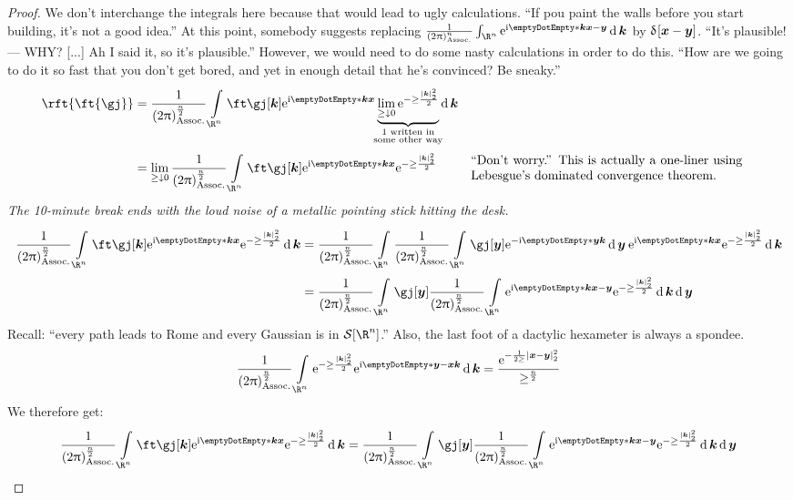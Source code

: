 \documentclass[10pt]{article}
\newcommand{\Rn}{{\R^n}}
\newcommand{\Schwartz}{{\SchwartzSpace\of{\Rn}}}
\newcommand{\sqftnrm}{\frac{1}{\pa{2\Pi}^n} }
\newcommand{\ftnrm}{\frac{1}{\pa{2\Pi}^\frac{n}{2}} }
\newcommand\commentbox[1]{\parbox{7.5cm}{#1}}
\begin{document}
\begin{proposition}
\begin{proof}
      We don't interchange the integrals here because that would lead to ugly calculations. ``If pou paint the walls before you start building, it's not a good idea.''
      At this point, somebody suggests replacing $\sqftnrm\int\Rn \E^{\I\scal\vk{\pascal{\vx-\vy}}}\diffd\vk$ by $\DiracDelta\of{\vx-\vy}$. ``It's plausible! --- WHY? [...] Ah I said it, so it's plausible.'' However, we would need to do some nasty calculations in order to do this. ``How are we going to do it so fast that you don't get bored, and yet in enough detail that he's convinced? Be sneaky.''
      \begin{align*}
        \rft{\ft{\gj}}
        &=\ftnrm\int\Rn\ft\gj\of\vk\E^{\I\scal\vk\vx}
        \underbrace{\lim_{\ge\downarrow 0}\E^{-\ge\frac{\norm\vk^2}{2}}}_{\mathclap{\substack{1
        \text{ written in}\\\text{some other way}}}}\diffd\vk\\
        &=\lim_{\ge\downarrow 0}\ftnrm\int\Rn\ft\gj\of\vk\E^{\I\scal\vk\vx}
        \E^{-\ge\frac{\norm\vk^2}{2}}&&\commentbox{``Don't worry.'' This is actually a one-liner 
        using Lebesgue's dominated convergence theorem.}
      \end{align*}
      \emph{The 10-minute break ends with the loud noise of a metallic pointing stick hitting the desk.}
      \begin{align*}
        \ftnrm\int\Rn\ft\gj\of\vk\E^{\I\scal\vk\vx}\E^{-\ge\frac{\norm\vk^2}{2}}\diffd\vk
        &=\ftnrm\int\Rn\ftnrm\int\Rn\gj\of\vy\E^{-\I\scal\vy\vk}\diffd\vy\:
        \E^{\I\scal\vk\vx}\E^{-\ge\frac{\norm\vk^2}{2}}\diffd\vk\\
        &=\ftnrm\int\Rn\gj\of\vy\ftnrm\int\Rn\E^{\I\scal\vk{\pascal{\vx-\vy}}}
        \E^{-\ge\frac{\norm\vk^2}{2}}\diffd\vk\diffd\vy
      \end{align*}
      Recall: ``every path leads to Rome and every Gaussian is in $\Schwartz$.'' Also, the last foot of a dactylic hexameter is always a spondee. 
      \begin{equation*}
        \ftnrm\int\Rn\E^{-\ge\frac{\norm\vk^2}{2}}\E^{\I\scal{\pascal{\vy-\vx}}\vk}\diffd\vk
        =\frac{\E^{-\frac{1}{2\ge}\norm{\vx-\vy}^2}}{\ge^\frac{n}{2}}
      \end{equation*}
      We therefore get:
      \begin{align*}
         \ftnrm\int\Rn\ft\gj\of\vk\E^{\I\scal\vk\vx}\E^{-\ge\frac{\norm\vk^2}{2}}\diffd\vk
         &=\ftnrm\int\Rn\gj\of\vy\ftnrm\int\Rn\E^{\I\scal\vk{\pascal{\vx-\vy}}}
        \E^{-\ge\frac{\norm\vk^2}{2}}\diffd\vk\diffd\vy\\

\end{align*}
\end{proof}
\end{proposition}
\end{document}
